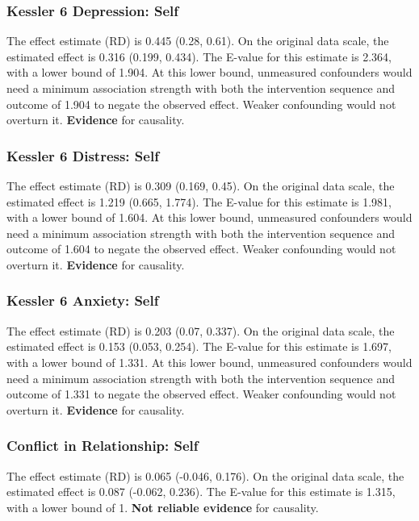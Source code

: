 \documentclass[
  singlecolumn]{article}
\begin{document}
\subsubsection{Kessler 6 Depression:
Self}\label{kessler-6-depression-self-16}

The effect estimate (RD) is 0.445 (0.28, 0.61). On the original data
scale, the estimated effect is 0.316 (0.199, 0.434). The E-value for
this estimate is 2.364, with a lower bound of 1.904. At this lower
bound, unmeasured confounders would need a minimum association strength
with both the intervention sequence and outcome of 1.904 to negate the
observed effect. Weaker confounding would not overturn it.
\textbf{Evidence} for causality.

\subsubsection{Kessler 6 Distress:
Self}\label{kessler-6-distress-self-16}

The effect estimate (RD) is 0.309 (0.169, 0.45). On the original data
scale, the estimated effect is 1.219 (0.665, 1.774). The E-value for
this estimate is 1.981, with a lower bound of 1.604. At this lower
bound, unmeasured confounders would need a minimum association strength
with both the intervention sequence and outcome of 1.604 to negate the
observed effect. Weaker confounding would not overturn it.
\textbf{Evidence} for causality.

\subsubsection{Kessler 6 Anxiety: Self}\label{kessler-6-anxiety-self-16}

The effect estimate (RD) is 0.203 (0.07, 0.337). On the original data
scale, the estimated effect is 0.153 (0.053, 0.254). The E-value for
this estimate is 1.697, with a lower bound of 1.331. At this lower
bound, unmeasured confounders would need a minimum association strength
with both the intervention sequence and outcome of 1.331 to negate the
observed effect. Weaker confounding would not overturn it.
\textbf{Evidence} for causality.

\subsubsection{Conflict in Relationship:
Self}\label{conflict-in-relationship-self-16}

The effect estimate (RD) is 0.065 (-0.046, 0.176). On the original data
scale, the estimated effect is 0.087 (-0.062, 0.236). The E-value for
this estimate is 1.315, with a lower bound of 1. \textbf{Not reliable
evidence} for causality.
\end{document}
